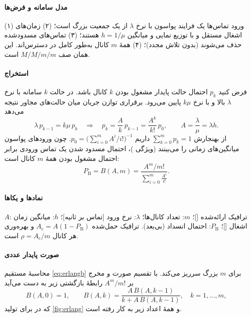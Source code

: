 \documentclass[11pt,a4paper]{article}
\begin{document}
\paragraph{مدل سامانه و فرض‌ها} (۱) ورود تماس‌ها یک فرایند پواسون با نرخ $\lambda$ از یک جمعیت
بزرگ است؛ (۲) زمان‌های اشغال مستقل و با توزیع نمایی و میانگین $h = 1/\mu$ هستند؛ (۳) تماس‌های
مسدودشده حذف می‌شوند (بدون تلاش مجدد)؛ (۴) همهٔ $m$ کانال به‌طور کامل در دسترس‌اند. این همان
صف $M/M/m/m$ است.

\paragraph{استخراج} فرض کنید $p_k$ احتمال حالت پایدار مشغول بودن $k$ کانال باشد. در حالت $k$
سامانه با نرخ $\lambda$ بالا و با نرخ $k\mu$ پایین می‌رود. برقراری توازن جریان میان حالت‌های
مجاور نتیجه می‌دهد
\begin{equation}\label{eq:balance}
  \lambda\,p_{k-1} = k\mu\,p_k \quad\Longrightarrow\quad
  p_k = \frac{A}{k}\,p_{k-1} = \frac{A^k}{k!}\,p_0, \qquad A = \frac{\lambda}{\mu} = \lambda h .
\end{equation}
از بهنجارش $\sum_{k=0}^{m}p_k = 1$ داریم $p_0 = \bigl(\sum_{i=0}^{m}A^i/i!\bigr)^{-1}$. چون
ورودهای پواسون میانگین‌های زمانی را می‌بینند (ویژگی )، احتمال مسدود شدن یک تماس
ورودی برابر احتمال مشغول بودن همهٔ $m$ کانال است:
\begin{equation}\label{eq:erlangb}
  P_{\mathrm{B}} = B(A,m) = \frac{A^m/m!}{\displaystyle\sum_{i=0}^{m}\frac{A^i}{i!}} .
\end{equation}
\paragraph{نمادها و یکاها} $A$: ترافیک ارائه‌شده []؛ $m$: تعداد کانال‌ها؛ $\lambda$: نرخ
ورود [تماس بر ثانیه]؛ $h$: میانگین زمان اشغال []؛ $P_{\mathrm{B}}$: احتمال انسداد (بی‌بعد).
ترافیک حمل‌شده $A_{\mathrm{c}} = A(1-P_{\mathrm{B}})$ و بهره‌وری هر کانال $\rho = A_{\mathrm{c}}/m$ است.

\paragraph{صورت پایدار عددی} محاسبهٔ مستقیم \cref{eq:erlangb} برای $m$ بزرگ سرریز می‌کند. با
تقسیم صورت و مخرج بر $A^m/m!$ رابطهٔ بازگشتی زیر به دست می‌آید
\begin{equation}\label{eq:erlangrec}
  B(A,0) = 1, \qquad B(A,k) = \frac{A\,B(A,k-1)}{k + A\,B(A,k-1)}, \quad k = 1,\dots,m,
\end{equation}
که در  برای تولید \cref{fig:erlang} و همهٔ اعداد زیر به کار رفته است.
\end{document}
